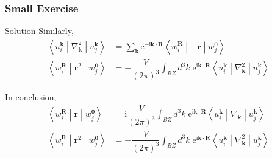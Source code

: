 \documentclass{beamer}
\begin{document}
  
  \begin{frame}
    \frametitle{Small Exercise}

    \begin{block}{Solution}
      \small 
      Similarly, 
      \begin{subequations}
        \begin{align}
          \left\langle{}u_i^{\mathbf{k}}\middle|\nabla^2_\mathbf{k}\middle|u_j^{\mathbf{k}}\right\rangle &= \sum_{\mathbf{k}}\mathrm{e}^{-\mathrm{i}\mathbf{k}\cdot\mathbf{R}}\left\langle{}w_i^{\mathbf{R}}\middle|-\mathbf{r}\middle|{}w_j^{\mathbf{0}}\right\rangle\\
          \left\langle{}w_i^{\mathbf{R}}\middle|\mathbf{r}^2\middle|{}w_j^{\mathbf{0}}\right\rangle &= -\dfrac{V}{(2\pi)^3}\int_{BZ}d^3k\; \mathrm{e}^{\mathrm{i}\mathbf{k}\cdot\mathbf{R}}\left\langle{}u_i^{\mathbf{k}}\middle|\nabla^2_\mathbf{k}\middle|u_j^{\mathbf{k}}\right\rangle
        \end{align}
      \end{subequations}

      In conclusion,
      \begin{equation*}
        \begin{aligned}
          \left\langle{}w_i^{\mathbf{R}}\middle|\mathbf{r}\middle|{}w_j^{\mathbf{0}}\right\rangle &= \mathrm{i}\dfrac{V}{(2\pi)^3}\int_{BZ}d^3k\; \mathrm{e}^{\mathrm{i}\mathbf{k}\cdot\mathbf{R}}\left\langle{}u_i^{\mathbf{k}}\middle|\nabla_\mathbf{k}\middle|u_j^{\mathbf{k}}\right\rangle\\
          \left\langle{}w_i^{\mathbf{R}}\middle|\mathbf{r}^2\middle|{}w_j^{\mathbf{0}}\right\rangle &= -\dfrac{V}{(2\pi)^3}\int_{BZ}d^3k\; \mathrm{e}^{\mathrm{i}\mathbf{k}\cdot\mathbf{R}}\left\langle{}u_i^{\mathbf{k}}\middle|\nabla^2_\mathbf{k}\middle|u_j^{\mathbf{k}}\right\rangle
        \end{aligned}
      \end{equation*}

    \end{block}

    \end{frame}
\end{document}
